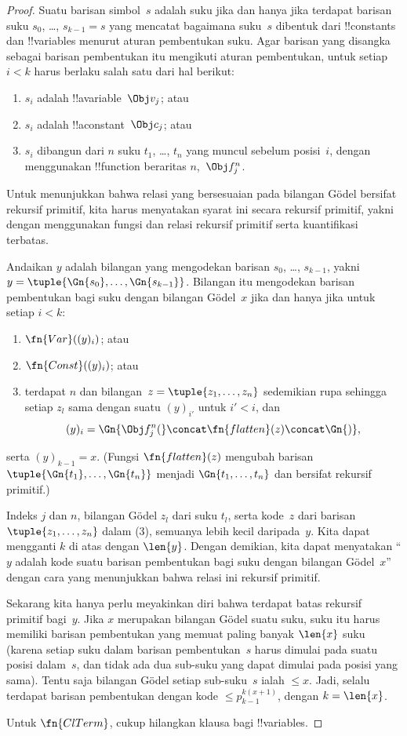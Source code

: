 \documentclass[../../../include/open-logic-section]{subfiles}
\begin{document}
\begin{proof}
Suatu barisan simbol~$s$ adalah suku jika dan hanya jika terdapat barisan suku
$s_0$, \dots, $s_{k-1} = s$ yang mencatat bagaimana suku~$s$ dibentuk dari
!!{constant}s dan !!{variable}s menurut aturan pembentukan suku. Agar barisan
yang disangka sebagai barisan pembentukan itu mengikuti aturan pembentukan,
untuk setiap $i < k$ harus berlaku salah satu dari hal berikut:
\begin{enumerate}
\item $s_i$ adalah !!a{variable}~$\Obj v_j$; atau
\item $s_i$ adalah !!a{constant}~$\Obj c_j$; atau
\item $s_i$ dibangun dari $n$ suku $t_1$, \dots, $t_n$ yang muncul sebelum
  posisi~$i$, dengan menggunakan !!{function} beraritas $n$,~$\Obj f^n_j$.
\end{enumerate}
Untuk menunjukkan bahwa relasi yang bersesuaian pada bilangan G\"odel bersifat
rekursif primitif, kita harus menyatakan syarat ini secara rekursif primitif,
yakni dengan menggunakan fungsi dan relasi rekursif primitif serta kuantifikasi
terbatas.

Andaikan $y$ adalah bilangan yang mengodekan barisan $s_0$, \dots,
$s_{k-1}$, yakni $y = \tuple{\Gn{s_0}, \dots, \Gn{s_{k-1}}}$. Bilangan itu
mengodekan barisan pembentukan bagi suku dengan bilangan G\"odel~$x$ jika dan
hanya jika untuk setiap $i < k$:
\begin{enumerate}
\item $\fn{Var}((y)_i)$; atau
\item $\fn{Const}((y)_i)$; atau
\item terdapat $n$ dan bilangan~$z = \tuple{z_1, \dots, z_n}$ sedemikian rupa
  sehingga setiap $z_l$ sama dengan suatu $(y)_{i'}$ untuk $i' < i$, dan
\[
(y)_i = \Gn{\Obj f^n_j(} \concat \fn{flatten}(z) \concat \Gn{)},
\]
\end{enumerate}
serta $(y)_{k-1} = x$. (Fungsi $\fn{flatten}(z)$ mengubah barisan
$\tuple{\Gn{t_1}, \dots, \Gn{t_n}}$ menjadi $\Gn{t_1, \dots, t_n}$ dan
bersifat rekursif primitif.)

Indeks $j$ dan $n$, bilangan G\"odel $z_l$ dari suku $t_l$, serta kode~$z$
dari barisan~$\tuple{z_1, \dots, z_n}$ dalam (3), semuanya lebih kecil
daripada~$y$. Kita dapat mengganti $k$ di atas dengan $\len{y}$. Dengan
demikian, kita dapat menyatakan ``$y$ adalah kode suatu barisan pembentukan
bagi suku dengan bilangan G\"odel~$x$'' dengan cara yang menunjukkan bahwa
relasi ini rekursif primitif.

Sekarang kita hanya perlu meyakinkan diri bahwa terdapat batas rekursif
primitif bagi~$y$. Jika $x$ merupakan bilangan G\"odel suatu suku, suku itu
harus memiliki barisan pembentukan yang memuat paling banyak $\len{x}$ suku
(karena setiap suku dalam barisan pembentukan~$s$ harus dimulai pada suatu
posisi dalam~$s$, dan tidak ada dua sub-suku yang dapat dimulai pada posisi
yang sama). Tentu saja bilangan G\"odel setiap sub-suku~$s$ ialah $\le x$.
Jadi, selalu terdapat barisan pembentukan dengan kode
$\le p_{k-1}^{k(x+1)}$, dengan $k=\len{x}$.

Untuk $\fn{ClTerm}$, cukup hilangkan klausa bagi !!{variable}s.
\end{proof}
\end{document}
